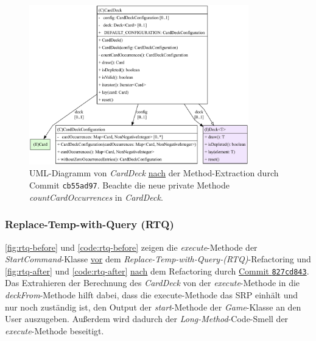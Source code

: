 \begin{figure}[H]
	\centering
	\includegraphics[width=0.85\textwidth]{Bilder/CardDeck_extract-after_structure.pdf} 
	\caption{UML-Diagramm von \textit{CardDeck} \underline{nach} der Method-Extraction durch Commit \texttt{cb55ad97}. 
	Beachte die neue private Methode \textit{countCardOccurrences} in \textit{CardDeck}.}
	\label{fig:extract-after}
\end{figure} 



\subsubsection{Replace-Temp-with-Query (RTQ)}

\autoref{fig:rtq-before} und \autoref{code:rtq-before} zeigen die \textit{execute}-Methode 
der \textit{StartCommand}-Klasse
\underline{vor} dem \textit{Replace-Temp-with-Query-(RTQ)}-Refactoring und \autoref{fig:rtq-after} und \autoref{code:rtq-after} \underline{nach}
dem Refactoring durch \underline{Commit \texttt{827cd843}}. \\
Das Extrahieren der Berechnung des \textit{CardDeck} von der \textit{execute}-Methode in die \textit{deckFrom}-Methode 
hilft dabei, dass die execute-Methode das SRP einhält und nur noch zuständig ist, den Output der \textit{start}-Methode 
der \textit{Game}-Klasse an den User auszugeben. Außerdem wird dadurch der \textit{Long-Method}-Code-Smell der 
\textit{execute}-Methode beseitigt.



